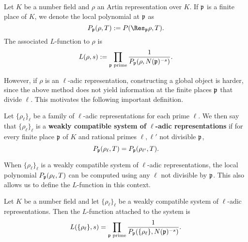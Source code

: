\begin{defn}
    Let $K$ be a number field and $\rho$ an Artin representation over $K$. If $\mathfrak{p}$ is a finite place of $K$, we denote the local polynomial at $\mathfrak{p}$ as 
    $$P_\pp(\rho,T):=P(\Res_\pp\rho,T).$$
    The associated $L$-function to $\rho$ is 
    $$L(\rho,s):=\prod_{\mathfrak{p}\text{ prime}}\frac{1}{P_{\mathfrak{p}}(\rho,N(\mathfrak{p})^{-s})}.$$
\end{defn}

However, if $\rho$ is an $\ell$-adic representation, constructing a global object is harder, since the above method does not yield information at the finite places $\mathfrak{p}$ that divide $\ell$. This motivates the following important definition.

\begin{defn}
    Let $\{\rho_\ell\}_{\ell}$ be a family of $\ell$-adic representations for each prime $\ell$. We then say that $\{\rho_\ell\}_\ell$ is a \textbf{weakly compatible system of $\ell$-adic representations} if for every finite place $\mathfrak{p}$ of $K$ and rational primes $\ell,\ell'$ not divisible $\mathfrak{p}$, 
    $$P_{\mathfrak{p}}(\rho_\ell,T)=P_{\mathfrak{p}}(\rho_{\ell'},T).$$
\end{defn}

When $\{\rho_\ell\}_\ell$ is a weakly compatible system of $\ell$-adic representations, the local polynomial $P_{\mathfrak{p}}(\rho_\ell,T)$ can be computed using any $\ell$ not divisible by $\mathfrak{p}$. This also allows us to define the $L$-function in this context.

\begin{defn}
    Let $K$ be a number field and let $\{\rho_\ell\}_\ell$ be a weakly compatible system of $\ell$-adic representations. Then the $L$-function attached to the system is 
    $$L(\{\rho_\ell\}, s)=\prod_{\mathfrak{p}\text{ prime}}\frac{1}{P_{\mathfrak{p}}(\{\rho_\ell\},N(\mathfrak{p})^{-s})}.$$
\end{defn}
